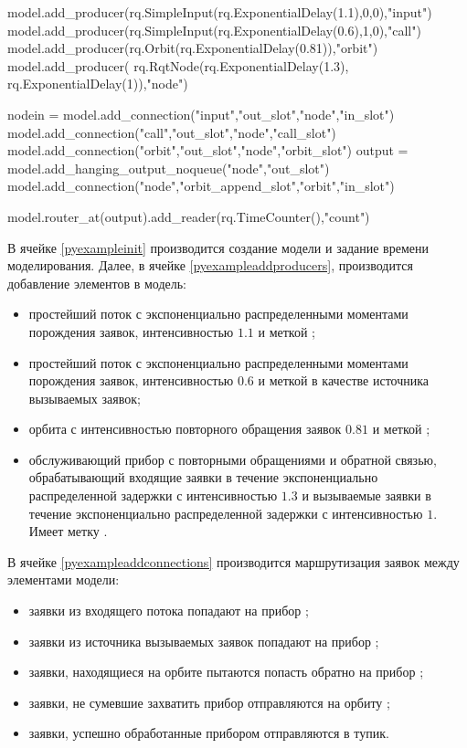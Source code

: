 \begin{pyin}[pyexampleaddproducers]
model.add_producer(rq.SimpleInput(rq.ExponentialDelay(1.1),0,0),"input")
model.add_producer(rq.SimpleInput(rq.ExponentialDelay(0.6),1,0),"call")
model.add_producer(rq.Orbit(rq.ExponentialDelay(0.81)),"orbit")
model.add_producer(
             rq.RqtNode(rq.ExponentialDelay(1.3),
             rq.ExponentialDelay(1)),"node")
\end{pyin}

\begin{pyin}[pyexampleaddconnections]
nodein = model.add_connection("input","out_slot","node","in_slot")
model.add_connection("call","out_slot","node","call_slot")
model.add_connection("orbit","out_slot","node","orbit_slot")
output = model.add_hanging_output_noqueue("node","out_slot")
model.add_connection("node","orbit_append_slot","orbit","in_slot")
\end{pyin}

\begin{pyin}[pyexampleaddreaders]
model.router_at(output).add_reader(rq.TimeCounter(),"count")
\end{pyin}

В ячейке \ref{pyexampleinit} производится создание модели и задание времени моделирования. Далее, в ячейке \ref{pyexampleaddproducers}, производится добавление элементов в модель:
\begin{itemize}
\item простейший поток с экспоненциально распределенными моментами порождения заявок, интенсивностью $1.1$ и меткой ;
\item простейший поток с экспоненциально распределенными моментами порождения заявок, интенсивностью $0.6$ и меткой  в качестве источника вызываемых заявок;
\item орбита с интенсивностью повторного обращения заявок $0.81$ и меткой ;
\item обслуживающий прибор с повторными обращениями и обратной связью, обрабатывающий входящие заявки в течение экспоненциально распределенной задержки с интенсивностью $1.3$ и вызываемые заявки в течение экспоненциально распределенной задержки с интенсивностью $1$. Имеет метку .
\end{itemize}

В ячейке \ref{pyexampleaddconnections} производится маршрутизация заявок между элементами модели:
\begin{itemize}
	\item заявки из входящего потока  попадают на прибор ;
	\item заявки из источника вызываемых заявок  попадают на прибор ;
	\item заявки, находящиеся на орбите  пытаются попасть обратно на прибор ;
	\item заявки, не сумевшие захватить прибор  отправляются на орбиту ;
	\item заявки, успешно обработанные прибором  отправляются в тупик.
\end{itemize}

